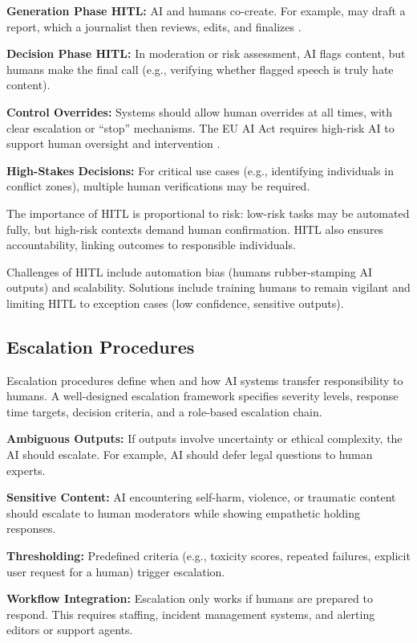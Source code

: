 \textbf{Generation Phase HITL:} AI and humans co-create. For example, \ishtar{} may draft a report, which a journalist then reviews, edits, and finalizes \cite{altexsoft2023}.

\textbf{Decision Phase HITL:} In moderation or risk assessment, AI flags content, but humans make the final call (e.g., verifying whether flagged speech is truly hate content).

\textbf{Control Overrides:} Systems should allow human overrides at all times, with clear escalation or ``stop'' mechanisms. The EU AI Act requires high-risk AI to support human oversight and intervention \cite{euai2025}.

\textbf{High-Stakes Decisions:} For critical use cases (e.g., identifying individuals in conflict zones), multiple human verifications may be required.

The importance of HITL is proportional to risk: low-risk tasks may be automated fully, but high-risk contexts demand human confirmation. HITL also ensures accountability, linking outcomes to responsible individuals.

Challenges of HITL include automation bias (humans rubber-stamping AI outputs) and scalability. Solutions include training humans to remain vigilant and limiting HITL to exception cases (low confidence, sensitive outputs).

\subsection{Escalation Procedures}\label{sec:ch11_escalation_expanded}

Escalation procedures define when and how AI systems transfer responsibility to humans. A well-designed escalation framework specifies severity levels, response time targets, decision criteria, and a role-based escalation chain.

\textbf{Ambiguous Outputs:} If outputs involve uncertainty or ethical complexity, the AI should escalate. For example, AI should defer legal questions to human experts.

\textbf{Sensitive Content:} AI encountering self-harm, violence, or traumatic content should escalate to human moderators while showing empathetic holding responses.

\textbf{Thresholding:} Predefined criteria (e.g., toxicity scores, repeated failures, explicit user request for a human) trigger escalation.

\textbf{Workflow Integration:} Escalation only works if humans are prepared to respond. This requires staffing, incident management systems, and alerting editors or support agents.

